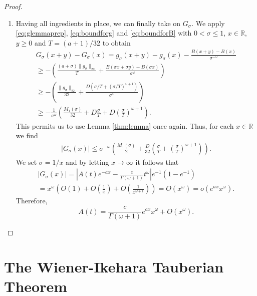 \begin{proof}
\begin{enumerate}
    
    \item Having all ingredients in place, we can finally take on $G_\sigma$. 
    We apply \eqref{eq:glemmaprep}, \eqref{eq:boundforg} and \eqref{eq:boundforB} with $0 < \sigma \leq 1$, $x \in \mathbb{R}$, $y \geq 0$ and $T = (a+1)/32$ to obtain
    \begin{align*}
        G_\sigma(x+y) - G_\sigma(x)
        = g_\sigma(x+y) - g_\sigma(x) - \frac{B(x+y) - B(x)}{\sigma^{-\omega}} \\
        \geq - \left( \frac{(a+\sigma) \lVert g_\sigma \rVert_\infty}{T} + \frac{B(\sigma x + \sigma y) - B(\sigma x)}{\sigma^\omega} \right) \\
        \geq - \left( \frac{\lVert g_\sigma \rVert_\infty}{32} + \frac{D( \sigma/T + (\sigma/T)^{\omega + 1} )}{\sigma^\omega} \right) \\
        \geq - \frac{1}{\sigma^{\omega}} \left( \frac{M_1(\sigma)}{32} + D \frac{\sigma}{T} + D\left( \frac{\sigma}{T} \right)^{\omega+1} \right).
    \end{align*}
    This permits us to use Lemma \ref{thm:lemma} once again. Thus, for each $x \in \mathbb{R}$ we find
    \begin{align*}
        |G_\sigma(x)| \leq \sigma^{-\omega} \left( \frac{M_1(\sigma)}{2} + \frac{D}{32} \left( \frac{\sigma}{T} + \left( \frac{\sigma}{T} \right)^{\omega + 1} \right) \right).
    \end{align*}
    We set $\sigma = 1/x$ and by letting $x \to \infty$ it follows that
    \begin{align*}
        |G_\sigma(x)| 
        = \left| A(t)e^{-a x} - \frac{c}{\Gamma(\omega + 1)} t^\omega \right| e^{-1}(1-e^{-1}) \\
        = x^\omega \left( O(1) + O\left(\frac 1x \right) + O\left( \frac{1}{x^{\omega + 1}} \right) \right)
        = O(x^\omega) = o(e^{ax} x^\omega).
    \end{align*}
    Therefore, 
    \begin{equation*}
        A(t) = \frac{c}{\Gamma(\omega + 1)} e^{a x} x^\omega + O(x^\omega).
    \end{equation*}
\end{enumerate}
\end{proof}









\section{The Wiener-Ikehara Tauberian Theorem}


